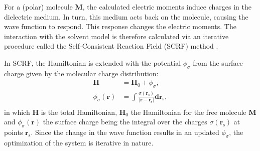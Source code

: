 For a (polar) molecule \textbf{M}, the calculated electric moments induce charges in the dielectric medium. In turn, this medium acts back on the molecule, causing the wave function to respond. This response changes the electric moments. The interaction with the solvent model is therefore calculated via an iterative procedure called the Self-Consistent Reaction Field (SCRF) method \cite{jensen}.

In SCRF, the Hamiltonian is extended with the potential $\phi_\sigma$ from the surface charge given by the molecular charge distribution:
\begin{equation}
\begin{split}
\mathbf{H}&=\mathbf{H}_0 + \phi_\sigma,\\
\phi_\sigma(\mathbf{r})&=\int\frac{\sigma(\mathbf{r}_\mathrm{s})}{|\mathbf{r}-\mathbf{r}_\mathrm{s}|}\mathbf{dr}_\mathrm{s},\\
\end{split}
\end{equation}
in which $\mathbf{H}$ is the total Hamiltonian, $\mathbf{H}_0$ the Hamiltonian for the free molecule \textbf{M} and $\phi_\sigma(\mathbf{r})$ the surface charge being the integral over the charges $\sigma(\mathbf{r}_\mathrm{s})$ at points $\mathbf{r}_\mathrm{s}$. Since the change in the wave function results in an updated $\phi_\sigma$, the optimization of the system is iterative in nature.

